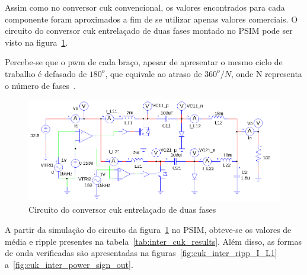 \documentclass[
	12pt,				%
	openright,			%
	twoside,			%
	a4paper,			%
	english,			%
	french,				%
	spanish,			%
	brazil,				%
	]{abntex2}
\begin{document}
Assim como no conversor cuk convencional, os valores encontrados para cada componente foram aproximados a fim de se utilizar apenas valores comerciais. O circuito do conversor cuk entrelaçado de duas fases montado no PSIM pode ser visto na figura~\ref{fig:interv_cuk_conv_psim_circuit}.

Percebe-se que o pwm de cada braço, apesar de apresentar o mesmo ciclo de trabalho é defasado de $180^o$, que equivale ao atraso de $360^o/N$, onde N representa o número de fases~\cite{JOSEPH_2015_Intervealed_CUK}.

\begin{figure}[htbp]%
	\begin{center}%
		\includegraphics[width= \textwidth]{interv_cuk_psim_circ}
		\caption{Circuito do conversor cuk entrelaçado de duas fases}
		\label{fig:interv_cuk_conv_psim_circuit}
	\end{center}
\end{figure}

A partir da simulação do circuito da figura~\ref{fig:interv_cuk_conv_psim_circuit} no PSIM, obteve-se os valores de média e ripple presentes na tabela~\ref{tab:inter_cuk_results}. Além disso, as formas de onda verificadas são apresentadas na figuras~\ref{fig:cuk_inter_ripp_I_L1} a~\ref{fig:cuk_inter_power_sign_out}.
\end{document}
